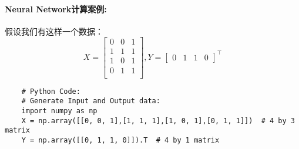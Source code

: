 \documentclass[a4paper,12pt,oneside]{book}
\begin{document}
\paragraph{Neural Network计算案例:}
假设我们有这样一个数据：
\begin{equation*}
    X = 
    \begin{bmatrix}
        0 & 0 & 1\\
        1 & 1 & 1\\
        1 & 0 & 1\\
        0 & 1 & 1\\
    \end{bmatrix}
    , Y = \begin{bmatrix}
        0 & 1 & 1 & 0 
    \end{bmatrix}^\top
\end{equation*}
\begin{lstlisting}
    # Python Code:
    # Generate Input and Output data:
    import numpy as np
    X = np.array([[0, 0, 1],[1, 1, 1],[1, 0, 1],[0, 1, 1]])  # 4 by 3 matrix
    Y = np.array([[0, 1, 1, 0]]).T  # 4 by 1 matrix
\end{lstlisting}
\end{document}
